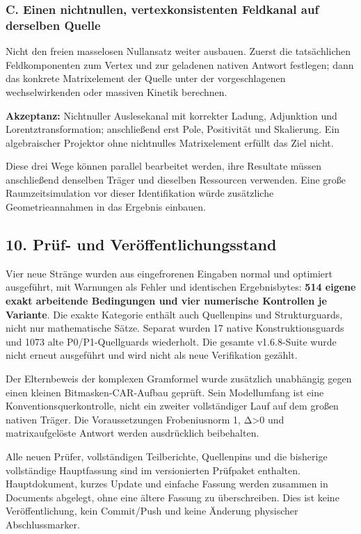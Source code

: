 \subsubsection{C. Einen nichtnullen, vertexkonsistenten Feldkanal auf
derselben
Quelle}\label{c.-einen-nichtnullen-vertexkonsistenten-feldkanal-auf-derselben-quelle}

Nicht den freien masselosen Nullansatz weiter ausbauen. Zuerst die
tatsächlichen Feldkomponenten zum Vertex und zur geladenen nativen
Antwort festlegen; dann das konkrete Matrixelement der Quelle unter der
vorgeschlagenen wechselwirkenden oder massiven Kinetik berechnen.

\textbf{Akzeptanz:} Nichtnuller Auslesekanal mit korrekter Ladung,
Adjunktion und Lorentztransformation; anschließend erst Pole,
Positivität und Skalierung. Ein algebraischer Projektor ohne nichtnulles
Matrixelement erfüllt das Ziel nicht.

Diese drei Wege können parallel bearbeitet werden, ihre Resultate müssen
anschließend denselben Träger und dieselben Ressourcen verwenden. Eine
große Raumzeitsimulation vor dieser Identifikation würde zusätzliche
Geometrieannahmen in das Ergebnis einbauen.

\subsection{10. Prüf- und
Veröffentlichungsstand}\label{pruxfcf--und-veruxf6ffentlichungsstand}

Vier neue Stränge wurden aus eingefrorenen Eingaben normal und optimiert
ausgeführt, mit Warnungen als Fehler und identischen Ergebnisbytes:
\textbf{514 eigene exakt arbeitende Bedingungen und vier numerische
Kontrollen je Variante}. Die exakte Kategorie enthält auch Quellenpins
und Strukturguards, nicht nur mathematische Sätze. Separat wurden 17
native Konstruktionsguards und 1073 alte P0/P1-Quellguards wiederholt.
Die gesamte v1.6.8-Suite wurde nicht erneut ausgeführt und wird nicht
als neue Verifikation gezählt.

Der Elternbeweis der komplexen Gramformel wurde zusätzlich unabhängig
gegen einen kleinen Bitmasken-CAR-Aufbau geprüft. Sein Modellumfang ist
eine Konventionsquerkontrolle, nicht ein zweiter vollständiger Lauf auf
dem großen nativen Träger. Die Voraussetzungen Frobeniusnorm 1,
Δ\textgreater0 und matrixaufgelöste Antwort werden ausdrücklich
beibehalten.

Alle neuen Prüfer, vollständigen Teilberichte, Quellenpins und die
bisherige vollständige Hauptfassung sind im versionierten Prüfpaket
enthalten. Hauptdokument, kurzes Update und einfache Fassung werden
zusammen in Documents abgelegt, ohne eine ältere Fassung zu
überschreiben. Dies ist keine Veröffentlichung, kein Commit/Push und
keine Änderung physischer Abschlussmarker.

